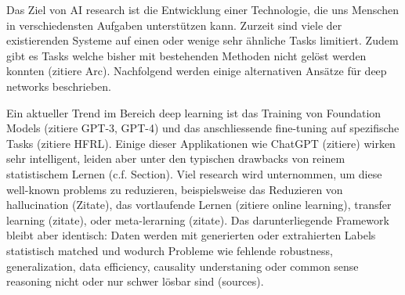 Das Ziel von AI research ist die Entwicklung einer Technologie, die uns Menschen in verschiedensten Aufgaben unterstützen kann. Zurzeit sind viele der existierenden Systeme auf einen oder wenige sehr ähnliche Tasks limitiert. Zudem gibt es Tasks welche bisher mit bestehenden Methoden nicht gelöst werden konnten (zitiere Arc). Nachfolgend werden einige alternativen Ansätze für deep networks beschrieben.

Ein aktueller Trend im Bereich deep learning ist das Training von Foundation Models (zitiere GPT-3, GPT-4) und das anschliessende fine-tuning auf spezifische Tasks (zitiere HFRL). Einige dieser Applikationen wie ChatGPT (zitiere) wirken sehr intelligent, leiden aber unter den typischen drawbacks von reinem statistischem Lernen (c.f. Section). Viel research wird unternommen, um diese well-known problems zu reduzieren, beispielsweise das Reduzieren von hallucination (Zitate), das  vortlaufende Lernen (zitiere online learning), transfer learning (zitate), oder meta-lerarning (zitate). Das darunterliegende Framework bleibt aber identisch: Daten werden mit generierten oder extrahierten Labels statistisch matched und wodurch Probleme wie fehlende robustness, generalization, data efficiency, causality understaning oder common sense reasoning nicht oder nur schwer lösbar sind (sources).

